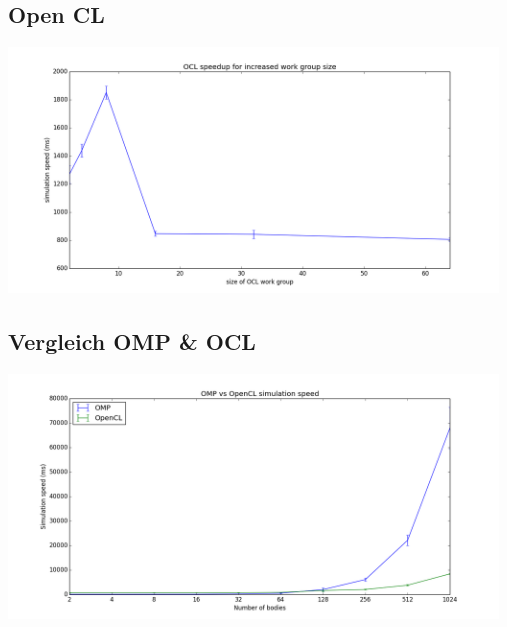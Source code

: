 \documentclass{beamer}
\begin{document}
\subsection{Open CL}
\begin{frame}
\includegraphics[width=13cm]{img/ocl.png}
\end{frame}

\subsection{Vergleich OMP \& OCL}
\begin{frame}
\includegraphics[width=13cm]{img/omp_and_ocl.png}
\end{frame}
\end{document}
